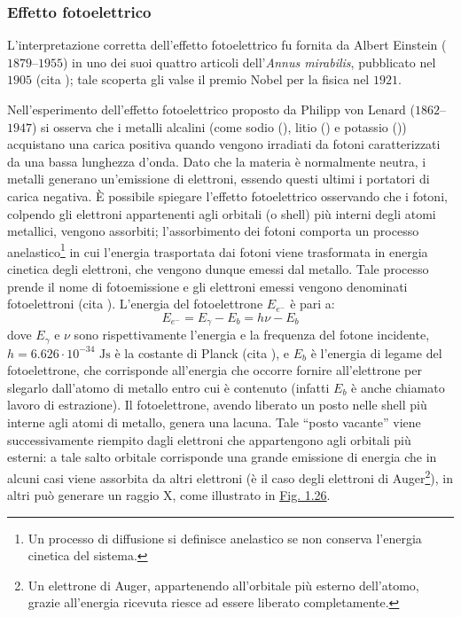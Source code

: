 \documentclass[12pt,a4paper,twoside]{report}
\begin{document}
	\subsubsection{Effetto fotoelettrico}\label{par:effetto_fotoelettrico}
	L'interpretazione corretta dell'effetto fotoelettrico fu fornita da Albert Einstein ($1879$--$1955$) in uno dei suoi quattro articoli dell'\textit{Annus mirabilis}, pubblicato nel $1905$ (cita
	); tale scoperta gli valse il premio Nobel per la fisica nel $1921$.
	
	Nell'esperimento dell'effetto fotoelettrico proposto da Philipp von Lenard ($1862$--$1947$) si osserva che i metalli alcalini (come sodio (), litio () e potassio ()) acquistano una carica positiva quando vengono irradiati da fotoni caratterizzati da una bassa lunghezza d'onda. Dato che la materia è normalmente neutra, i metalli generano un'emissione di elettroni, essendo questi ultimi i portatori di carica negativa. \`E possibile spiegare l'effetto fotoelettrico osservando che i fotoni, colpendo gli elettroni appartenenti agli orbitali (o shell) più interni degli atomi metallici, vengono assorbiti; l'assorbimento dei fotoni comporta un processo anelastico\footnote{Un processo di diffusione si definisce anelastico se non conserva l'energia cinetica del sistema.} in cui l'energia trasportata dai fotoni viene trasformata in energia cinetica degli elettroni, che vengono dunque emessi dal metallo. Tale processo prende il nome di fotoemissione e gli elettroni emessi vengono denominati fotoelettroni (cita
	). L'energia del fotoelettrone $E_{e^-}$ è pari a:
	\begin{equation}
		E_{e^-}=E_\gamma-E_b=h\nu-E_b
		\label{eq:fotoelettrico}
	\end{equation}
	dove $E_\gamma$ e $\nu$ sono rispettivamente l'energia e la frequenza del fotone incidente, $h=6.626\cdot 10^{-34}\mbox{ Js}$ è la costante di Planck (cita
	), e $E_b$ è l'energia di legame del fotoelettrone, che corrisponde all'energia che occorre fornire all'elettrone per slegarlo dall'atomo di metallo entro cui è contenuto (infatti $E_b$ è anche chiamato lavoro di estrazione). Il fotoelettrone, avendo liberato un posto nelle shell più interne agli atomi di metallo, genera una lacuna. Tale ``posto vacante'' viene successivamente riempito dagli elettroni che appartengono agli orbitali più esterni: a tale salto orbitale corrisponde una grande emissione di energia che in alcuni casi viene assorbita da altri elettroni (è il caso degli elettroni di Auger\footnote{Un elettrone di Auger, appartenendo all'orbitale più esterno dell'atomo, grazie all'energia ricevuta riesce ad essere liberato completamente.}), in altri può generare un raggio X, come illustrato in \hyperref[fig:fotoelettrico]{Fig. 1.26}.
\end{document}
